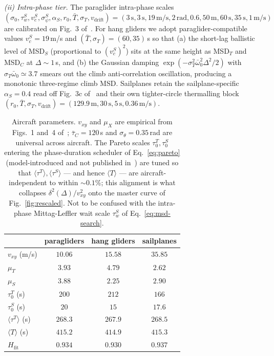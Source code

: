 \documentclass[10pt,twocolumn,a4paper]{article}
\begin{document}
\emph{(ii) Intra-phase tier.} The paraglider intra-phase scales
$(\sigma_0,\tau_w^S,v_c^S,\sigma_\psi^S,\alpha_S,r_0,\bar{T},
\sigma_T,v_{\mathrm{drift}})=(3\,\mathrm{s},3\,\mathrm{s},
19\,\mathrm{m/s},2\,\mathrm{rad},0.6,50\,\mathrm{m},60\,\mathrm{s},
35\,\mathrm{s},1\,\mathrm{m/s})$ are calibrated on Fig.~3
of~\cite{vilpellet2026}. For hang gliders we adopt
paraglider-compatible values $v_c^S=19$\,m/s and
$(\bar{T},\sigma_T)=(60,35)$\,s so that (a) the short-lag ballistic
level of MSD$_S$ (proportional to $(v_c^S)^2$) sits at the same
height as MSD$_T$ and MSD$_C$ at $\Delta\sim 1$\,s, and (b) the
Gaussian damping $\exp(-\sigma_T^2\bar{\omega}_0^2\Delta^2/2)$
with $\sigma_T\bar{\omega}_0\simeq 3.7$ smears out the climb
anti-correlation oscillation, producing a monotonic three-regime
climb MSD. Sailplanes retain the sailplane-specific
$\alpha_S=0.4$ read off Fig.~3c of~\cite{vilpellet2026} and their
own tighter-circle thermalling block
$(r_0,\bar{T},\sigma_T,v_{\mathrm{drift}})=
(129.9\,\mathrm{m},30\,\mathrm{s},5\,\mathrm{s},0.36\,\mathrm{m/s})$.

\begin{table}[!t]
\centering
\footnotesize
\begin{tabular}{lccc}
\hline\hline
 & paragliders & hang gliders & sailplanes \\
\hline
$v_{xy}$ (m/s)             & $10.06$ & $15.58$ & $35.85$ \\
$\mu_T$                    & $3.93$  & $4.79$  & $2.62$ \\
$\mu_S$                    & $3.88$  & $2.25$  & $2.90$ \\
$\tau_0^T$ (s)             & $200$   & $212$   & $166$  \\
$\tau_0^S$ (s)             & $20$    & $15$    & $17.6$ \\
$\langle\tau^T\rangle$ (s) & $268.3$ & $267.9$ & $268.5$ \\
$\langle T\rangle$ (s)     & $415.2$ & $414.9$ & $415.3$ \\
$H_{\mathrm{fit}}$         & $0.934$ & $0.930$ & $0.937$ \\
\hline\hline
\end{tabular}
\caption{\label{tab:params}%
Aircraft parameters. $v_{xy}$ and $\mu_X$ are empirical from
Figs.~1 and~4 of~\cite{vilpellet2026}; $\bar{\tau}_C=120$\,s and
$\sigma_\theta=0.35$\,rad are universal across aircraft. The
Pareto scales $\tau_0^T,\tau_0^S$ entering the
phase-duration scheduler of Eq.~\eqref{eq:pareto} (model-introduced
and not published in~\cite{vilpellet2026}) are tuned so that
$\langle\tau^T\rangle,\langle\tau^S\rangle$ --- and hence
$\langle T\rangle$ --- are aircraft-independent to within
$\sim 0.1$\%; this alignment is what collapses
$\delta^2(\Delta)/v_{xy}^2$ onto the master curve of
Fig.~\ref{fig:rescaled}. Not to be confused with the intra-phase
Mittag-Leffler wait scale $\tau_w^S$ of Eq.~\eqref{eq:msd-search}.}
\end{table}
\end{document}

